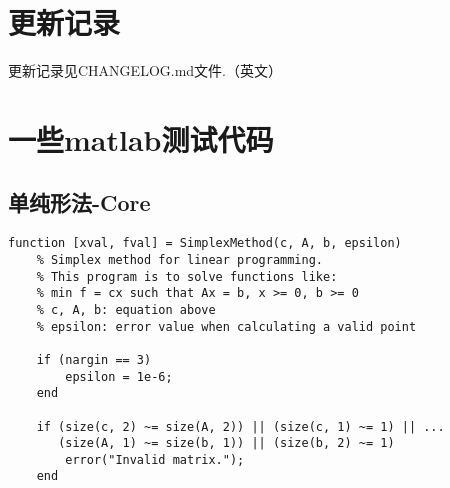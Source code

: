 \documentclass[bwprint, withouttitlepage, openfonts]{mathexpthesis}
\begin{document}
\begin{appendices}
\section{更新记录}
更新记录见CHANGELOG.md文件.（英文）

\section{一些matlab测试代码}
\subsection{单纯形法-Core}
\begin{verbatim}
function [xval, fval] = SimplexMethod(c, A, b, epsilon)
    % Simplex method for linear programming.
    % This program is to solve functions like:
    % min f = cx such that Ax = b, x >= 0, b >= 0
    % c, A, b: equation above
    % epsilon: error value when calculating a valid point
    
    if (nargin == 3)
        epsilon = 1e-6;
    end

    if (size(c, 2) ~= size(A, 2)) || (size(c, 1) ~= 1) || ...
       (size(A, 1) ~= size(b, 1)) || (size(b, 2) ~= 1)
        error("Invalid matrix.");
    end


\end{verbatim}
\end{appendices}
\end{document}
